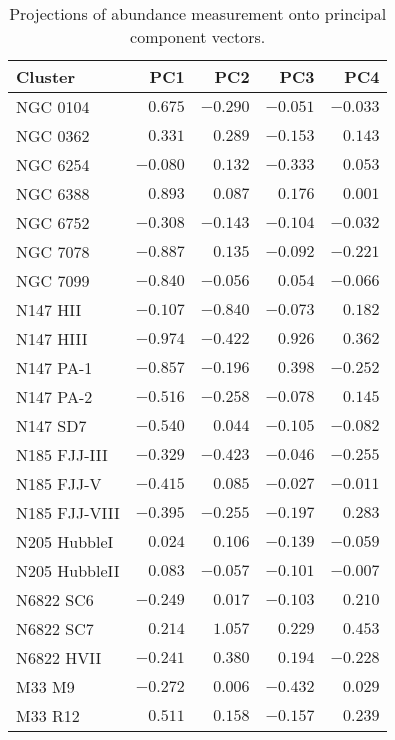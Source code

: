\documentclass{aa}
\begin{document}
\begin{table}
\caption{Projections of abundance measurement onto principal component vectors.}
\label{tab:pca}
\centering
\small
\begin{tabular}{l r r r r}
\hline\hline
 Cluster & PC1 & PC2 & PC3 & PC4 \\ \hline
NGC 0104        & $ 0.675$ & $-0.290$ & $-0.051$ & $-0.033$  \\
NGC 0362        & $ 0.331$ & $ 0.289$ & $-0.153$ & $ 0.143$  \\
NGC 6254        & $-0.080$ & $ 0.132$ & $-0.333$ & $ 0.053$  \\
NGC 6388        & $ 0.893$ & $ 0.087$ & $ 0.176$ & $ 0.001$  \\
NGC 6752        & $-0.308$ & $-0.143$ & $-0.104$ & $-0.032$  \\
NGC 7078        & $-0.887$ & $ 0.135$ & $-0.092$ & $-0.221$  \\
NGC 7099        & $-0.840$ & $-0.056$ & $ 0.054$ & $-0.066$  \\
N147 HII        & $-0.107$ & $-0.840$ & $-0.073$ & $ 0.182$  \\
N147 HIII       & $-0.974$ & $-0.422$ & $ 0.926$ & $ 0.362$  \\
N147 PA-1       & $-0.857$ & $-0.196$ & $ 0.398$ & $-0.252$  \\
N147 PA-2       & $-0.516$ & $-0.258$ & $-0.078$ & $ 0.145$  \\
N147 SD7        & $-0.540$ & $ 0.044$ & $-0.105$ & $-0.082$  \\
N185 FJJ-III    & $-0.329$ & $-0.423$ & $-0.046$ & $-0.255$  \\
N185 FJJ-V      & $-0.415$ & $ 0.085$ & $-0.027$ & $-0.011$  \\
N185 FJJ-VIII   & $-0.395$ & $-0.255$ & $-0.197$ & $ 0.283$  \\
N205 HubbleI    & $ 0.024$ & $ 0.106$ & $-0.139$ & $-0.059$  \\
N205 HubbleII   & $ 0.083$ & $-0.057$ & $-0.101$ & $-0.007$  \\
N6822 SC6       & $-0.249$ & $ 0.017$ & $-0.103$ & $ 0.210$  \\
N6822 SC7       & $ 0.214$ & $ 1.057$ & $ 0.229$ & $ 0.453$  \\
N6822 HVII      & $-0.241$ & $ 0.380$ & $ 0.194$ & $-0.228$  \\
M33 M9          & $-0.272$ & $ 0.006$ & $-0.432$ & $ 0.029$  \\
M33 R12         & $ 0.511$ & $ 0.158$ & $-0.157$ & $ 0.239$  \\

\end{tabular}
\end{table}
\end{document}
